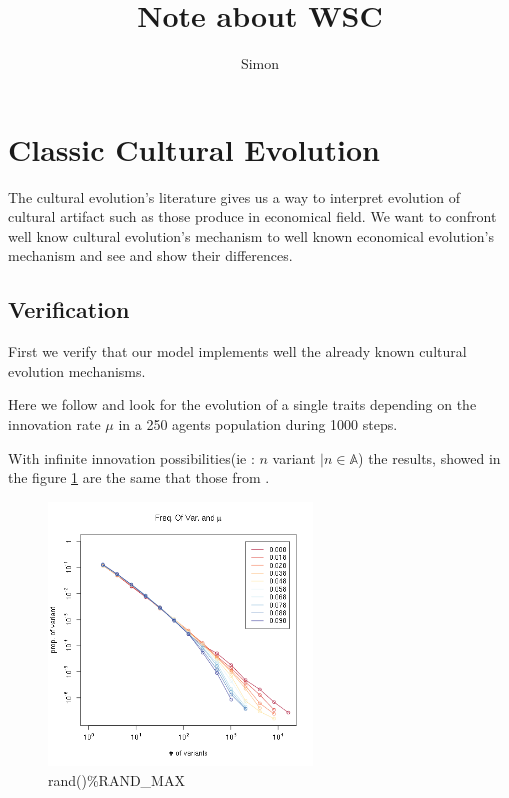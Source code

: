 \documentclass[a4paper]{article}
\title{Note about WSC}
\author{Simon}
\begin{document}
\maketitle
\section{Classic Cultural Evolution}



The cultural evolution's literature gives us a way to interpret evolution of cultural artifact such as those produce in economical field. We want to confront well know cultural evolution's mechanism to well known economical evolution's mechanism and see and show their differences.

\subsection{Verification}
First we verify that our model implements well the already known cultural evolution mechanisms.

Here we follow \cite{mesoudi2009randomcopyingfrequencydependencopyingandulturechange,bentley2004randomdriftandculturechange} and look for the evolution of a single traits depending on the innovation rate $\mu$ in a 250 agents population during 1000 steps.


With infinite innovation possibilities(ie : $n$ variant $| n\in\mathbb{A} $) the results, showed in the figure \ref{fig:allMutation} are the same that those from \cite{bentley2004randomdriftandculturechange}.
\begin{figure}[hbp]
	\begin{center}
		\includegraphics[width=7cm]{img/allmuRandMax.png}
	\end{center}
	\caption{rand()\%RAND\_MAX}
	\label{fig:allMutation}
\end{figure}
\end{document}
